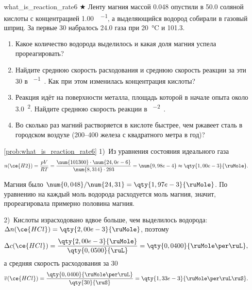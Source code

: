 \begin{problem}{}{what_is_reaction_rate6}
    $\bigstar$ Ленту магния массой \qty{0,048}{\ruG} опустили в \qty{50,0}{\ruMl} соляной кислоты с концентрацией \qty{1,00}{\ruMole\per\ruL}, а выделяющийся водород собирали в газовый шприц. За первые \qty{30}{\ruS} набралось \qty{24,0}{\ruMl} газа при \qty{20}{\degreeCelsius} и \qty{101,3}{\ruKPa}.
    \begin{enumerate}[label=\arabic*)]
        \item Какое количество водорода выделилось и какая доля магния успела прореагировать?
        \item Найдите среднюю скорость расходования  и среднюю скорость реакции за эти \qty{30}{\ruS} в \unit{\ruMole\per\ruL\ruS}. Как при этом изменилась концентрация кислоты?
        \item Реакция идёт на поверхности металла, площадь которой в начале опыта около \qty{3,0}{\ruCm\squared}. Найдите среднюю скорость реакции в \unit{\ruMole\per\ruM\squared\ruS}.
        \item Во сколько раз магний растворяется в кислоте быстрее, чем ржавеет сталь в городском воздухе (\num{200}--\qty{400}{\ruG} железа с квадратного метра в год)?
    \end{enumerate}
    \begin{sol}{\ref{prob:what_is_reaction_rate6}}
        1)~Из уравнения состояния идеального газа
        \begin{equation*}
            n(\ce{H2}) = \frac{pV}{RT} = \frac{\num{101300} \cdot \num{24,0e-6}}{\num{8,314} \cdot 293} = \num{9,98e-4} \approx \qty{1,00e-3}{\ruMole}.
        \end{equation*}

        Магния было $\num{0,048}/\num{24,31} = \qty{1,97e-3}{\ruMole}$. По уравнению  на каждый моль водорода расходуется моль магния, значит, прореагировала примерно половина магния.

        2)~Кислоты израсходовано вдвое больше, чем выделилось водорода: $\Delta n(\ce{HCl}) = \qty{2,00e-3}{\ruMole}$, поэтому
        \begin{equation*}
            \Delta c(\ce{HCl}) = \frac{\qty{2,00e-3}{\ruMole}}{\qty{0,0500}{\ruL}} = \qty{0,0400}{\ruMole\per\ruL},
        \end{equation*}
        а средняя скорость расходования  за \qty{30}{\ruS}
        \begin{equation*}
            \overline{v}(\ce{HCl}) = \frac{\qty{0,0400}{\ruMole\per\ruL}}{\qty{30}{\ruS}} = \qty{1,33e-3}{\ruMole\per\ruL\ruS}.
        \end{equation*}


\end{sol}
\end{problem}
